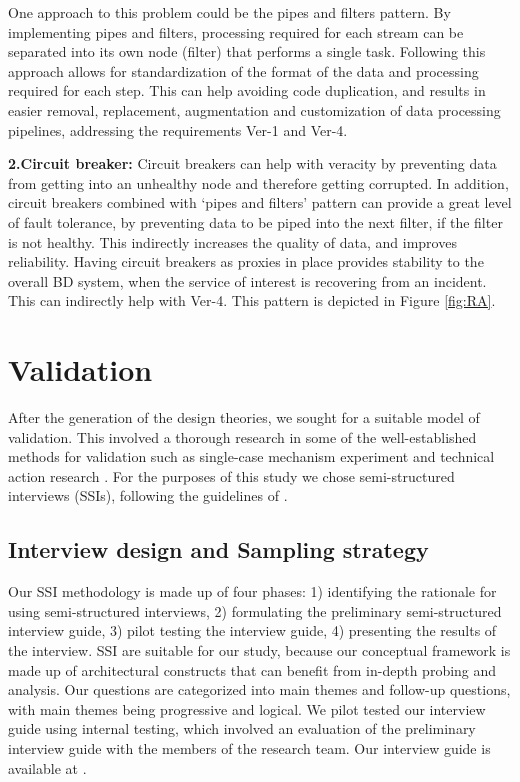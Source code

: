 \documentclass[a4paper,11pt,article,oneside]{memoir}
\begin{document}
One approach to this problem could be the pipes and filters pattern. By implementing pipes and filters, processing required for each stream can be separated into its own node (filter) that performs a single task. Following this approach allows for standardization of the format of the data and processing required for each step. This can help avoiding code duplication, and results in easier removal, replacement, augmentation and customization of data processing pipelines, addressing the requirements Ver-1 and Ver-4.

\vspace{6px}
\textbf{2.Circuit breaker:} Circuit breakers can help with veracity by preventing data from getting into an unhealthy node and therefore getting corrupted. In addition, circuit breakers combined with `pipes and filters' pattern can provide a great level of fault tolerance, by preventing data to be piped into the next filter, if the filter is not healthy. This indirectly increases the quality of data, and improves reliability. Having circuit breakers as proxies in place provides stability to the overall BD system, when the service of interest is recovering from an incident. This can indirectly help with Ver-4. This pattern is depicted in Figure \ref{fig:RA}.


\chapter{Validation}

After the generation of the design theories, we sought for a suitable model of validation. This involved a thorough research in some of the well-established methods for validation such as single-case mechanism experiment and technical action research \citep{wieringa2014design}. For the purposes of this study we chose semi-structured interviews (SSIs), following the guidelines of \citet{kallio2016systematic}. 

\section{Interview design and Sampling strategy}
Our SSI methodology is made up of four phases: 1) identifying the rationale for using semi-structured interviews, 2) formulating the preliminary semi-structured interview guide, 3) pilot testing the interview guide, 4) presenting the results of the interview. SSI are suitable for our study, because our conceptual framework is made up of architectural constructs that can benefit from in-depth probing and analysis. Our questions are categorized into main themes and follow-up questions, with main themes being progressive and logical. We pilot tested our interview guide using internal testing, which involved an evaluation of the preliminary interview guide with the members of the research team. Our interview guide is available at \cite{interviewGuide}.
\end{document}
